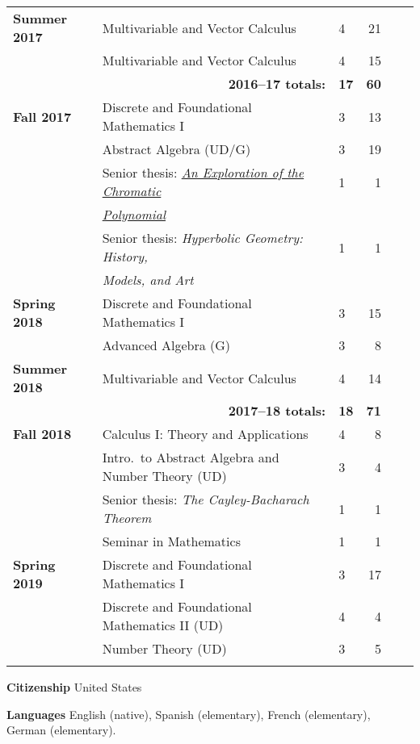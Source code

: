 \documentclass[12pt]{article}
\begin{document}
{\begin{center}
\begin{longtable}{@{} l l l rrr @{}}
\textbf{Summer 2017} & Multivariable and Vector Calculus & 4 & 21 \\
                     & Multivariable and Vector Calculus & 4 & 15 \\

 \cmidrule{2-4}
 & \multicolumn{1}{r}{\textbf{2016--17 totals:}} & \textbf{17} & \textbf{60} \\
  \cmidrule{2-4}

\textbf{Fall 2017} & Discrete and Foundational Mathematics I & 3 & 13 \\
 & Abstract Algebra (UD/G) & 3 & 19 \\
 & Senior thesis: \href{https://scholarworks.boisestate.edu/math_undergraduate_theses/7/}{\emph{An Exploration of the Chromatic}} & 1 & 1 \\
 & \qquad \href{https://scholarworks.boisestate.edu/math_undergraduate_theses/7/}{\emph{Polynomial}} & & \\
 & Senior thesis: \emph{Hyperbolic Geometry: History,} & 1 & 1 \\
 & \qquad \emph{Models, and Art} & & \\
\addlinespace[0.1in]

\textbf{Spring 2018} & Discrete and Foundational Mathematics I & 3 & 15 \\
 & Advanced Algebra (G) & 3 & 8 \\
\addlinespace[0.1in]

\textbf{Summer 2018} & Multivariable and Vector Calculus & 4 & 14 \\

 \cmidrule{2-4}
 & \multicolumn{1}{r}{\textbf{2017--18 totals:}} & \textbf{18} & \textbf{71} \\
 \cmidrule{2-4}

\textbf{Fall 2018} & Calculus I: Theory and Applications & 4 & 8 \\
 & Intro.\ to Abstract Algebra and Number Theory (UD) & 3 & 4 \\
 & Senior thesis: \emph{The Cayley-Bacharach Theorem} & 1 & 1 \\
 & Seminar in Mathematics & 1 & 1 \\
\addlinespace[0.1in]

\textbf{Spring 2019} & Discrete and Foundational Mathematics I & 3 & 17 \\
 & Discrete and Foundational Mathematics II (UD) & 4 & 4 \\
 & Number Theory (UD) & 3 & 5 \\
\addlinespace[0.1in]

\bottomrule


\end{longtable}
\end{center}

}



\textbf{Citizenship}
\quad United States
\bigskip


\textbf{Languages}
\quad English (native), Spanish (elementary), French (elementary), German (elementary).
\bigskip
\end{document}
